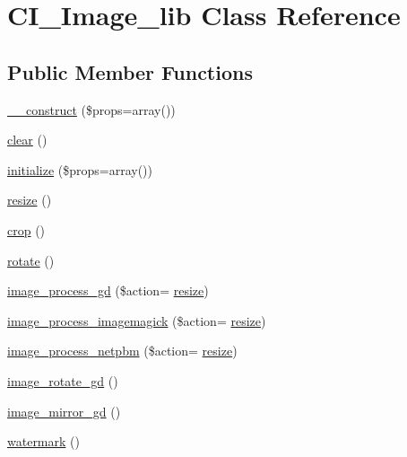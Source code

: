 \hypertarget{class_c_i___image__lib}{}\section{C\+I\+\_\+\+Image\+\_\+lib Class Reference}
\label{class_c_i___image__lib}
\subsection*{Public Member Functions}
\begin{DoxyCompactItemize}
\item 
\hyperlink{class_c_i___image__lib_a563262d396a1cef6153c9998d77bb548}{\+\_\+\+\_\+construct} (\$props=array())
\item 
\hyperlink{class_c_i___image__lib_aa821bec12eaa7e0f649397c9675ff505}{clear} ()
\item 
\hyperlink{class_c_i___image__lib_a0bccf32e3d2d283de0521949330cb969}{initialize} (\$props=array())
\item 
\hyperlink{class_c_i___image__lib_a94e38a7d478ce07200a52c51497e598e}{resize} ()
\item 
\hyperlink{class_c_i___image__lib_a77248c0134d1b117eb36774ecee6e04c}{crop} ()
\item 
\hyperlink{class_c_i___image__lib_a74e94d71195d9cbb9c9e3bca3353d912}{rotate} ()
\item 
\hyperlink{class_c_i___image__lib_a3744cd1438c26d74169260e3580c18c5}{image\+\_\+process\+\_\+gd} (\$action= \textquotesingle{}\hyperlink{class_c_i___image__lib_a94e38a7d478ce07200a52c51497e598e}{resize}\textquotesingle{})
\item 
\hyperlink{class_c_i___image__lib_ab92e23a2b66ec7e2a3ade452214ac3fd}{image\+\_\+process\+\_\+imagemagick} (\$action= \textquotesingle{}\hyperlink{class_c_i___image__lib_a94e38a7d478ce07200a52c51497e598e}{resize}\textquotesingle{})
\item 
\hyperlink{class_c_i___image__lib_a715b6f648450b393c843af9a8756f6d8}{image\+\_\+process\+\_\+netpbm} (\$action= \textquotesingle{}\hyperlink{class_c_i___image__lib_a94e38a7d478ce07200a52c51497e598e}{resize}\textquotesingle{})
\item 
\hyperlink{class_c_i___image__lib_ae0d52ef7503342a0a1c56c99da140446}{image\+\_\+rotate\+\_\+gd} ()
\item 
\hyperlink{class_c_i___image__lib_a3f6d47ec077726da699890d4644797ad}{image\+\_\+mirror\+\_\+gd} ()
\item 
\hyperlink{class_c_i___image__lib_a4732a76680e7c0b28f98f6634b567cc9}{watermark} ()

\end{DoxyCompactItemize}
